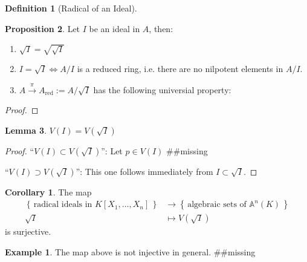 \documentclass[a4paper]{book}
\theoremstyle{definition}
\newtheorem{definition}{Definition}[]
\newtheorem{example}{Example}[definition]
\newtheorem{corollary}{Corollary}
\newtheorem{lemma}[definition]{Lemma}
\newtheorem{proposition}[definition]{Proposition}
\newcommand{\set}[1]{\left\{\, #1 \,\right\}}
\begin{document}
\begin{defbox}    
    \begin{definition}[Radical of an Ideal]

    \end{definition}
\end{defbox}
\begin{thmbox}
    \begin{proposition}
        Let \(I\) be an ideal in \(A\), then:
        \begin{enumerate}
            \item \(\sqrt{I} = \sqrt{\sqrt{I}}\)
            \item \(I = \sqrt{I} \iff A / I\) is a reduced ring, i.e. there are no nilpotent elements in \(A / I\).
            \item \(A \overset{\pi}{\longrightarrow} A_\text{red} := A / \sqrt{I}\) has the following universial property:
        \end{enumerate}
    \end{proposition}
\end{thmbox}
\begin{proof}
    
\end{proof}
\begin{thmbox}
    \begin{lemma}
        \(V(I) = V(\sqrt{I})\)
    \end{lemma}
\end{thmbox}
\begin{proof}
    ``\(V(I) \subset V(\sqrt{I})\)'': Let \(p \in V(I)\) \#\#missing

    \noindent``\(V(I) \supset V(\sqrt{I})\)'': This one follows immediately from \(I \subset \sqrt{I}\).
\end{proof}
\begin{thmbox}
    \begin{corollary}
        The map
        \begin{align*}
            \set{\text{radical ideals in } K[X_1, \ldots, X_n]} &\rightarrow \set{\text{algebraic sets of }\mathbb{A}^n(K)} \\
            \sqrt{I} &\mapsto V(\sqrt{I})
        \end{align*}
        is surjective.
    \end{corollary}
\end{thmbox}
\begin{exmbox}
    \begin{example}
        The map above is not injective in general. \#\#missing
    \end{example}
\end{exmbox}
\end{document}

